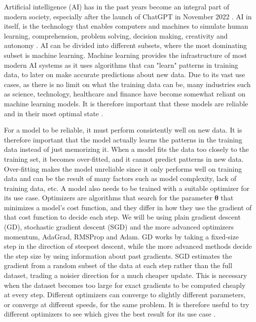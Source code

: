 \documentclass[reprint,english,notitlepage]{revtex4-2}  %
\begin{document}



Artificial intelligence (AI) has in the past years become an integral part of modern society, especially after the launch of ChatGPT in November 2022 \cite{ChatGPT}. AI in itself, is the technology that enables computers and machines to simulate human learning, comprehension, problem solving, decision making, creativity and autonomy \cite{whatisai}. AI can be divided into different subsets, where the most dominating subset is machine learning. Machine learning provides the infrastructure of most modern AI systems as it uses algorithms that can "learn" patterns in training data, to later on make accurate predictions about new data. Due to its vast use cases, as there is no limit on what the training data can be, many industries such as science, technology, healthcare and finance have become somewhat reliant on machine learning models. It is therefore important that these models are reliable and in their most optimal state \cite{Bergmann2025}.

For a model to be reliable, it must perform consistently well on new data. It is therefore important that the model actually learns the patterns in the training data instead of just memorizing it. When a model fits the data too closely to the training set, it becomes over-fitted, and it cannot predict patterns in new data. Over-fitting makes the model unreliable since it only performs well on training data and can be the result of many factors such as model complexity, lack of training data, etc. A model also needs to be trained with a suitable optimizer for its use case. Optimizers are algorithms that search for the parameter $\bm{\theta}$ that minimizes a model's cost function, and they differ in how they use the gradient of that cost function to decide each step. We will be using plain gradient descent (GD), stochastic gradient descent (SGD) and the more advanced optimizers momentum, AdaGrad, RMSProp and Adam. GD works by taking a fixed-size step in the direction of steepest descent, while the more advanced methods decide the step size by using information about past gradients. SGD estimates the gradient from a random subset of the data at each step rather than the full dataset, trading a noisier direction for a much cheaper update. This is necessary when the dataset becomes too large for exact gradients to be computed cheaply at every step. Different optimizers can converge to slightly different parameters, or converge at different speeds, for the same problem. It is therefore useful to try different optimizers to see which gives the best result for its use case \cite{lecture_book}.
\end{document}
